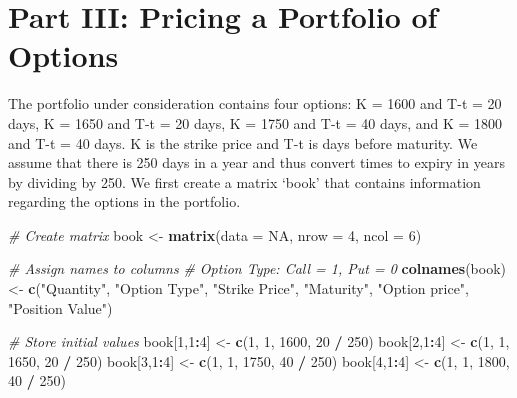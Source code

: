 \documentclass[]{article}
\newenvironment{Shaded}{\begin{snugshade}}{\end{snugshade}}
\newcommand{\CommentTok}[1]{\textcolor[rgb]{0.56,0.35,0.01}{\textit{#1}}}
\newcommand{\DataTypeTok}[1]{\textcolor[rgb]{0.13,0.29,0.53}{#1}}
\newcommand{\DecValTok}[1]{\textcolor[rgb]{0.00,0.00,0.81}{#1}}
\newcommand{\KeywordTok}[1]{\textcolor[rgb]{0.13,0.29,0.53}{\textbf{#1}}}
\newcommand{\NormalTok}[1]{#1}
\newcommand{\OperatorTok}[1]{\textcolor[rgb]{0.81,0.36,0.00}{\textbf{#1}}}
\newcommand{\OtherTok}[1]{\textcolor[rgb]{0.56,0.35,0.01}{#1}}
\newcommand{\StringTok}[1]{\textcolor[rgb]{0.31,0.60,0.02}{#1}}
\begin{document}
\hypertarget{part-iii-pricing-a-portfolio-of-options}{%
\section{Part III: Pricing a Portfolio of
Options}\label{part-iii-pricing-a-portfolio-of-options}}

The portfolio under consideration contains four options: K = 1600 and
T-t = 20 days, K = 1650 and T-t = 20 days, K = 1750 and T-t = 40 days,
and K = 1800 and T-t = 40 days. K is the strike price and T-t is days
before maturity. We assume that there is 250 days in a year and thus
convert times to expiry in years by dividing by 250. We first create a
matrix `book' that contains information regarding the options in the
portfolio.

\begin{Shaded}
\begin{Highlighting}[]
\CommentTok{\# Create matrix}
\NormalTok{book <{-}}\StringTok{ }\KeywordTok{matrix}\NormalTok{(}\DataTypeTok{data =} \OtherTok{NA}\NormalTok{, }\DataTypeTok{nrow =} \DecValTok{4}\NormalTok{, }\DataTypeTok{ncol =} \DecValTok{6}\NormalTok{)}

\CommentTok{\# Assign names to columns}
\CommentTok{\# Option Type: Call = 1, Put = 0}
\KeywordTok{colnames}\NormalTok{(book) <{-}}\StringTok{ }\KeywordTok{c}\NormalTok{(}\StringTok{"Quantity"}\NormalTok{, }\StringTok{"Option Type"}\NormalTok{, }\StringTok{"Strike Price"}\NormalTok{, }\StringTok{"Maturity"}\NormalTok{, }\StringTok{"Option price"}\NormalTok{, }\StringTok{"Position Value"}\NormalTok{)}

\CommentTok{\# Store initial values}
\NormalTok{book[}\DecValTok{1}\NormalTok{,}\DecValTok{1}\OperatorTok{:}\DecValTok{4}\NormalTok{] <{-}}\StringTok{ }\KeywordTok{c}\NormalTok{(}\DecValTok{1}\NormalTok{, }\DecValTok{1}\NormalTok{, }\DecValTok{1600}\NormalTok{, }\DecValTok{20} \OperatorTok{/}\StringTok{ }\DecValTok{250}\NormalTok{)}
\NormalTok{book[}\DecValTok{2}\NormalTok{,}\DecValTok{1}\OperatorTok{:}\DecValTok{4}\NormalTok{] <{-}}\StringTok{ }\KeywordTok{c}\NormalTok{(}\DecValTok{1}\NormalTok{, }\DecValTok{1}\NormalTok{, }\DecValTok{1650}\NormalTok{, }\DecValTok{20} \OperatorTok{/}\StringTok{ }\DecValTok{250}\NormalTok{)}
\NormalTok{book[}\DecValTok{3}\NormalTok{,}\DecValTok{1}\OperatorTok{:}\DecValTok{4}\NormalTok{] <{-}}\StringTok{ }\KeywordTok{c}\NormalTok{(}\DecValTok{1}\NormalTok{, }\DecValTok{1}\NormalTok{, }\DecValTok{1750}\NormalTok{, }\DecValTok{40} \OperatorTok{/}\StringTok{ }\DecValTok{250}\NormalTok{)}
\NormalTok{book[}\DecValTok{4}\NormalTok{,}\DecValTok{1}\OperatorTok{:}\DecValTok{4}\NormalTok{] <{-}}\StringTok{ }\KeywordTok{c}\NormalTok{(}\DecValTok{1}\NormalTok{, }\DecValTok{1}\NormalTok{, }\DecValTok{1800}\NormalTok{, }\DecValTok{40} \OperatorTok{/}\StringTok{ }\DecValTok{250}\NormalTok{)}
\end{Highlighting}
\end{Shaded}
\end{document}
